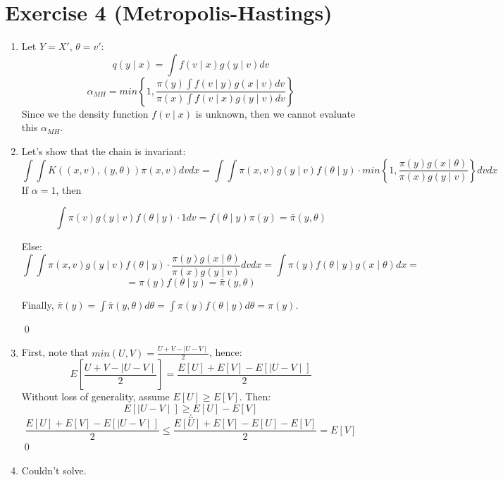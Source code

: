 \documentclass[12pt,letterpaper]{article}
\begin{document}
\section*{Exercise 4 (Metropolis-Hastings)}
\begin{enumerate}[leftmargin=!,labelindent=5pt]
\item Let $Y = X'$, $\theta = v'$:
$$q(y \mid x) = \int f(v \mid x) g(y \mid v) dv$$
$$
\alpha_{MH} = min \left \{ 1,
\frac{\pi(y)\int f(v \mid y) g(x \mid v) dv}
{\pi(x)\int f(v \mid x) g(y \mid v) dv}
\right \}
$$
Since we the density function $f(v \mid x)$ is unknown, then we cannot 
evaluate this $\alpha_{MH}$.

\item Let's show that the chain is invariant:
$$
\int \int K((x,v),(y,\theta)) \pi(x,v) dv dx= 
\int \int \pi(x,v) g(y \mid v) f(\theta \mid y)
\cdot min \left \{
1, \frac{\pi(y)g(x \mid \theta)}{\pi(x)g(y\mid v)}
\right\} dv dx
$$
If $\alpha =1 $, then

$$
\int \pi(v) g(y \mid v) f(\theta \mid y)
\cdot 1
dv = f(\theta \mid y) \pi(y) = \bar\pi(y, \theta)
$$

Else:
$$
\int \int \pi(x,v) g(y \mid v) f(\theta \mid y)
\cdot 
\frac{\pi(y)g(x \mid \theta)}{\pi(x)g(y\mid v)}
dv dx = 
\int \pi(y) f(\theta \mid y) g(x \mid \theta) dx =
$$
$$
= \pi(y) f(\theta \mid y) = \bar\pi(y, \theta)
$$

Finally, $\bar\pi(y) = \int \bar\pi(y,\theta) d\theta = 
\int \pi(y) f(\theta \mid y) d\theta = \pi(y)$.

\qed

\item First, note that $min(U,V) = \frac{U+V -\mid U - V \mid}{2}$, hence:
$$
E \left[
	\frac{U + V - \mid U - V \mid}{2}
\right] = 
\frac{E[U] + E[V] - E[\mid U - V \mid] }{2}
$$
Without loss of generality, assume $E[U] \geq E[V]$. Then:
$$
E[\mid U - V \mid] \geq E[U] - E[V]
$$
$$
\therefore
$$
$$
\frac{E[U] + E[V] - E[\mid U - V \mid] }{2} \leq
\frac{E[U] + E[V] - E[U]- E[V]}{2} = E[V]
$$
\qed

\item Couldn't solve.
\end{enumerate}

\newpage
\end{document}
